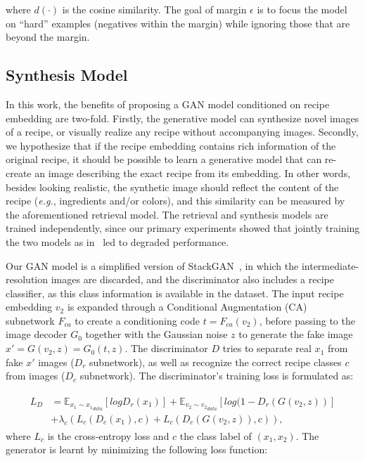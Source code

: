 \documentclass[sigconf,nonacm]{acmart}
\def\eg{\emph{e.g.}} \def\Eg{\emph{E.g.}}
\begin{document}
\noindent where $d\left(\cdot \right)$ is the cosine similarity.
The goal of margin $\epsilon$ is to focus the model on ``hard'' examples (negatives within the margin) while ignoring those that are beyond the margin. 



\subsection{Synthesis Model}

In this work, the benefits of proposing a GAN model conditioned on recipe embedding are two-fold. Firstly, the generative model can synthesize novel images of a recipe, or visually realize any recipe without accompanying images. Secondly, we hypothesize that if the recipe embedding contains rich information of the original recipe, it should be possible to learn a generative model that can re-create an image describing the exact recipe from its embedding. In other words, besides looking realistic, the synthetic image should reflect the content of the recipe (\eg, ingredients and/or colors), and this similarity can be measured by the aforementioned retrieval model. The retrieval and synthesis models are trained independently, since our primary experiments showed that jointly training the two models as in~\cite{wang2019} led to degraded performance.

Our GAN model is a simplified version of StackGAN~\cite{Zhang2017-jm}, in which the intermediate-resolution images are discarded, and the discriminator also includes a recipe classifier, as this class information is available in the dataset. The input recipe embedding $v_2$ is expanded through a Conditional Augmentation (CA)~\cite{Zhang2017-jm} subnetwork $F_{ca}$ to create a conditioning code $t = F_{ca}(v_2)$, before passing to the image decoder $G_0$ together with the Gaussian noise $z$ to generate the fake image $x' = G(v_2,z) = G_0(t,z)$. The discriminator $D$ tries to separate 
real $x_1$ from fake $x'$ images
($D_r$ subnetwork), as well as recognize the correct recipe classes $c$ from images ($D_c$ subnetwork).
The discriminator's training loss is formulated as:



\begin{align}
    \begin{split}
    L_D & = \mathbb{E}_{x_1 \sim {x_1}_{data}}[logD_{r}(x_1)] + \mathbb{E}_{v_2 \sim {v_2}_{data}}[log(1 - D_r(G(v_2,z))] \\ 
    & + \lambda _c (L_c(D_c (x_1), c) + L_c (D_c (G(v_2,z)), c)),
    \label{eq:d_loss}
    \end{split}
\end{align}
where $L_c$ is the 
cross-entropy loss and $c$ 
the class label of 
$(x_1, x_2)$. The generator is learnt by minimizing the following loss function:
\end{document}
